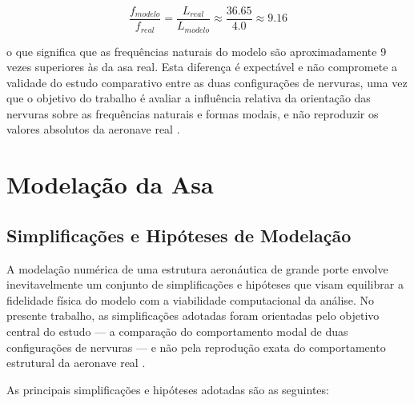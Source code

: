 \documentclass[a4paper,fleqn]{cas-sc}
\begin{document}
\begin{equation}
    \frac{f_{modelo}}{f_{real}} = \frac{L_{real}}{L_{modelo}} 
    \approx \frac{36.65}{4.0} \approx 9.16
    \label{eq:escala_freq}
\end{equation}

\noindent o que significa que as frequências naturais do modelo são aproximadamente 9 vezes superiores às da asa real. Esta diferença é expectável e não compromete a validade do estudo comparativo entre as duas configurações de nervuras, uma vez que o objetivo do trabalho é avaliar a influência relativa da orientação das nervuras sobre as frequências naturais e formas modais, e não reproduzir os valores absolutos da aeronave real \cite{Dowell2004}.

\clearpage

\section{Modelação da Asa}
\label{chap:modelacao}

\subsection{Simplificações e Hipóteses de Modelação}

A modelação numérica de uma estrutura aeronáutica de grande porte envolve inevitavelmente um conjunto de simplificações e hipóteses que visam equilibrar a fidelidade física do modelo com a viabilidade computacional da análise. No presente trabalho, as simplificações adotadas foram orientadas pelo objetivo central do estudo --- a comparação do comportamento modal de duas configurações de nervuras --- e não pela reprodução exata do comportamento estrutural da aeronave real \cite{Dowell2004}.

As principais simplificações e hipóteses adotadas são as seguintes:
\end{document}

